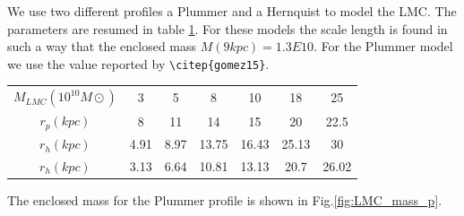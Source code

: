 We use two different profiles a Plummer and a Hernquist to model the 
LMC. The parameters are resumed in table \ref{tab:LMC}. For these 
models the scale length is found in such a way that the enclosed 
mass  $M(9kpc) = 1.3E10$. For the Plummer model we use the value
reported by \verb+\citep{gomez15}+.



\begin{table}[H]{\label{tab:LMC}}
\begin{center}
\begin{tabular}{c c c c c c c}
\hline
\hline
$M_{LMC} (10^10M\odot)$ & 3 & 5 & 8 & 10 & 18 & 25 \\
$r_p(kpc)$ & 8 & 11 & 14 & 15 & 20 & 22.5 \\
$r_h(kpc)$ & 4.91 & 8.97 & 13.75 & 16.43 & 25.13 & 30 \\
$r_h(kpc)$ & 3.13 & 6.64 & 10.81 & 13.13 & 20.7 & 26.02 \\
\hline
\end{tabular}
\end{center}
\end{table}

The enclosed mass for the Plummer profile is shown in Fig.\ref{fig:LMC_mass_p}.


